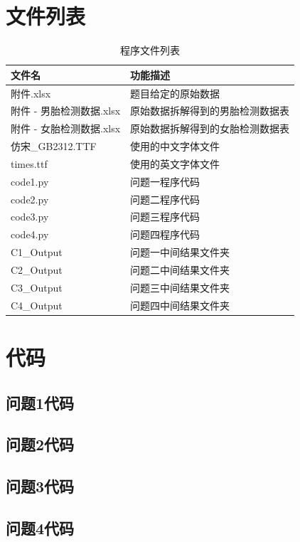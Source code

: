 \documentclass[withoutpreface,bwprint]{cumcmthesis} %
\begin{document}
\begin{appendices}
    \section{文件列表}
    \begin{table}[H]
        \caption{程序文件列表}
        \centering
        \begin{tabularx}{\textwidth}{l l}
            \bottomrule[1.5pt]
            文件名 & 功能描述 \\
            \midrule[1pt]
            附件.xlsx & 题目给定的原始数据\\
            附件 - 男胎检测数据.xlsx & 原始数据拆解得到的男胎检测数据表 \\
            附件 - 女胎检测数据.xlsx & 原始数据拆解得到的女胎检测数据表 \\
            仿宋\_GB2312.TTF & 使用的中文字体文件 \\
            times.ttf & 使用的英文字体文件 \\
            code1.py & 问题一程序代码 \\
            code2.py & 问题二程序代码 \\
            code3.py & 问题三程序代码 \\
            code4.py & 问题四程序代码 \\
            C1\_Output & 问题一中间结果文件夹 \\
            C2\_Output & 问题二中间结果文件夹 \\
            C3\_Output & 问题三中间结果文件夹 \\
            C4\_Output & 问题四中间结果文件夹 \\
            \bottomrule[1.5pt]
        \end{tabularx}
        \label{tab:文件列表}
    \end{table}



    \section{代码}
    \subsection{问题1代码}
            
    \subsection{问题2代码}
        
    \subsection{问题3代码}
        
    \subsection{问题4代码}
        

\end{appendices}
\end{document}
